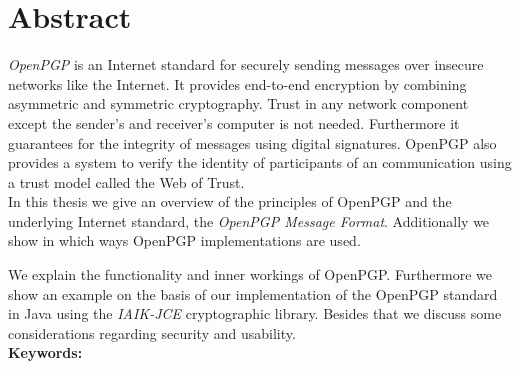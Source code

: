 

\chapter*{Abstract}
\label{cha:abstract}


\emph{OpenPGP} is an Internet standard for securely sending messages over insecure networks like the Internet. It provides end-to-end encryption by combining asymmetric and symmetric cryptography. Trust in any network component except the sender's and receiver's computer is not needed. Furthermore it guarantees for the integrity of messages using digital signatures. OpenPGP also provides a system to verify the identity of participants of an communication using a trust model called the Web of Trust. \\


In this thesis we give an overview of the principles of OpenPGP and the underlying Internet standard, the \textit{OpenPGP Message Format}. 
Additionally we show in which ways OpenPGP implementations are used.

We explain the functionality and inner workings of OpenPGP. Furthermore we show an example on the basis of our implementation of the OpenPGP standard in Java using the \emph{IAIK-JCE} cryptographic library.
Besides that we discuss some considerations regarding security and usability. 
\\



\textbf{Keywords:} \mykeywords

